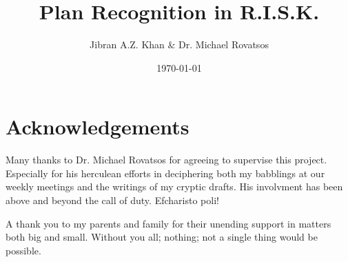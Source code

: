 \documentclass[parskip]{cs4rep}
\begin{document}
\title{Plan Recognition in R.I.S.K.}

\author{Jibran A.Z. Khan \& Dr. Michael Rovatsos}



\date{\today}


\maketitle

\section*{Acknowledgements}

Many thanks to Dr. Michael Rovatsos for agreeing to supervise this project. Especially for his herculean efforts in deciphering both my babblings at our weekly meetings and the writings of my cryptic drafts. His involvment has been above and beyond the call of duty. Efcharisto poli!

A thank you to my parents and family for their unending support in matters both big and small. Without you all; nothing; not a single thing would be possible.
\end{document}
